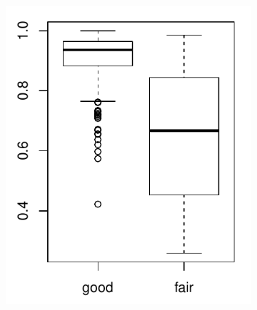 \begin{figure}
\begin{subfigure}{.45\textwidth}
\includegraphics[width=\linewidth]{../simulation/plots/ARI_vs_init_case3}
\caption{}
\label{fig: ARI boxplot, case 3}
\end{subfigure}
\begin{subfigure}{.45\textwidth}

\end{subfigure}
\end{figure}
